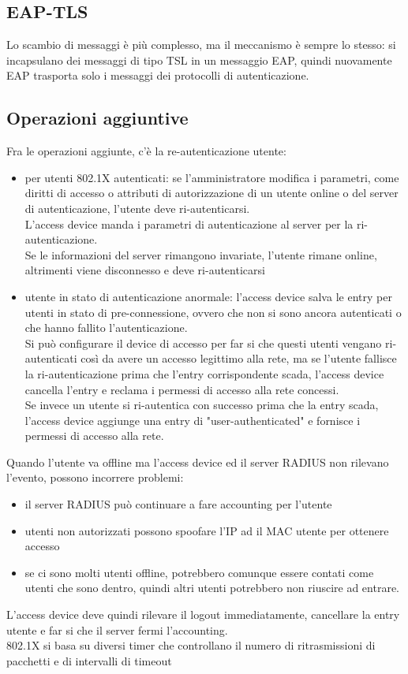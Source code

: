 \documentclass[12pt, oneside]{extbook} %
\begin{document}
\subsection{EAP-TLS}
Lo scambio di messaggi è più complesso, ma il meccanismo è sempre lo stesso: si incapsulano dei messaggi di tipo TSL in un messaggio EAP, quindi nuovamente EAP trasporta solo i messaggi dei protocolli di autenticazione.

\subsection{Operazioni aggiuntive}
Fra le operazioni aggiunte, c'è la re-autenticazione utente:
    \begin{itemize}
        \item per utenti 802.1X autenticati: se l'amministratore modifica i parametri, come diritti di accesso o attributi di autorizzazione di un utente online o del server di autenticazione, l'utente deve ri-autenticarsi.
        \\L'access device manda i parametri di autenticazione al server per la ri-autenticazione.
        \\Se le informazioni del server rimangono invariate, l'utente rimane online, altrimenti viene disconnesso e deve ri-autenticarsi
        \item utente in stato di autenticazione anormale: l'access device salva le entry per utenti in stato di pre-connessione, ovvero che non si sono ancora autenticati o che hanno fallito l'autenticazione.
        \\Si può configurare il device di accesso per far si che questi utenti vengano ri-autenticati così da avere un accesso legittimo alla rete, ma se l'utente fallisce la ri-autenticazione prima che l'entry corrispondente scada, l'access device cancella l'entry e reclama i permessi di accesso alla rete concessi.
        \\Se invece un utente si ri-autentica con successo prima che la entry scada, l'access device aggiunge una entry di "user-authenticated" e fornisce i permessi di accesso alla rete.
    \end{itemize}
Quando l'utente va offline ma l'access device ed il server RADIUS non rilevano l'evento, possono incorrere problemi:
    \begin{itemize}
        \item il server RADIUS può continuare a fare accounting per l'utente
        \item utenti non autorizzati possono spoofare l'IP ad il MAC utente per ottenere accesso
        \item se ci sono molti utenti offline, potrebbero comunque essere contati come utenti che sono dentro, quindi altri utenti potrebbero non riuscire ad entrare.
    \end{itemize}
L'access device deve quindi rilevare il logout immediatamente, cancellare la entry utente e far si che il server fermi l'accounting.
\\802.1X si basa su diversi timer che controllano il numero di ritrasmissioni di pacchetti e di intervalli di timeout
\end{document}

